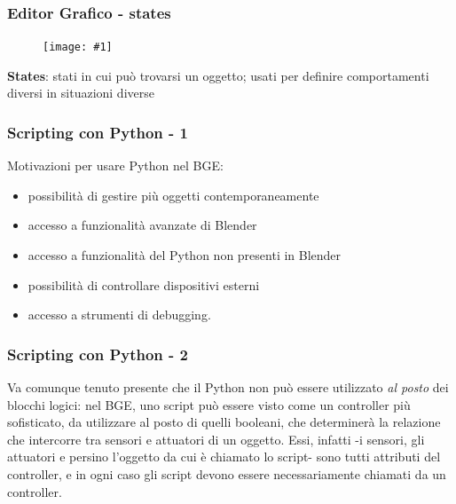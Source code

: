 \documentclass{beamer}
\def\image[#1][#2]{
	\begin{figure}[H]
		\centering
		\texttt{[image: \#1]}
\end{figure}}
\begin{document}
		\begin{frame}
			\frametitle{Editor Grafico - states}
			\image[images/states.png][scale=0.3]
			\textbf{States}: stati in cui può trovarsi un oggetto; usati per definire comportamenti diversi in situazioni diverse %
		\end{frame}
		\begin{frame}
		\frametitle{Scripting con Python - 1}
		Motivazioni per usare Python nel BGE:
			\begin{itemize}
				\item possibilità di gestire più oggetti contemporaneamente
				\item accesso a funzionalità avanzate di Blender
				\item accesso a funzionalità del Python non presenti in Blender
				\item possibilità di controllare dispositivi esterni
				\item accesso a strumenti di debugging.
			\end{itemize}
		\end{frame}	
		\begin{frame}
		\frametitle{Scripting con Python - 2}
		Va comunque tenuto presente che \textcolor{BlenderOrange}{il Python non può essere utilizzato \textit{al posto} dei blocchi logici}: nel BGE, uno script può essere visto come un controller più sofisticato, da utilizzare al posto di quelli booleani, che determinerà la relazione che intercorre tra sensori e attuatori di un oggetto. Essi, infatti -i sensori, 	gli attuatori e persino l'oggetto da cui è chiamato lo script- sono tutti attributi del controller, e in ogni caso gli script devono essere necessariamente chiamati da un controller.
		\end{frame}	
	
\end{document}
